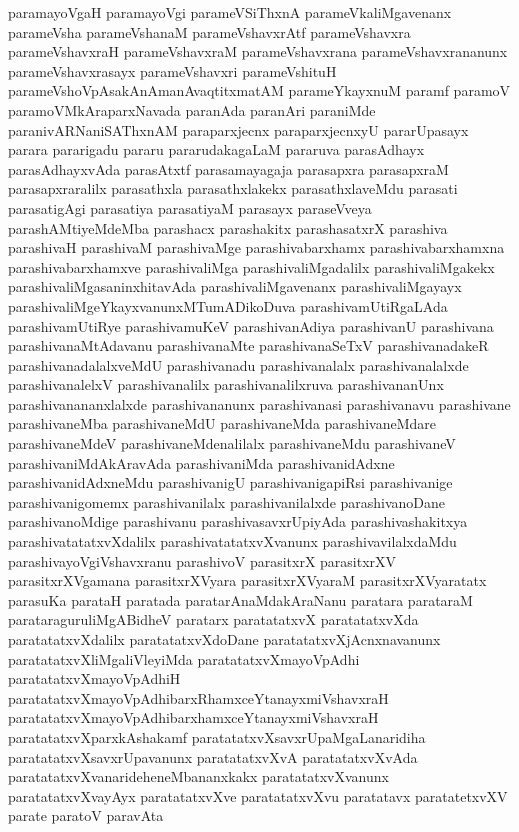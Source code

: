 {paramayoVgaH
paramayoVgi
parameVSiThxnA
parameVkaliMgavenanx
parameVsha
parameVshanaM
parameVshavxrAtf
parameVshavxra
parameVshavxraH
parameVshavxraM
parameVshavxrana
parameVshavxrananunx
parameVshavxrasayx
parameVshavxri
parameVshituH
parameVshoVpAsakAnAmanAvaqtitxmatAM
parameYkayxnuM
paramf
paramoV
paramoVMkAraparxNavada
paranAda
paranAri
paraniMde
paranivARNaniSAThxnAM
paraparxjecnx
paraparxjecnxyU
pararUpasayx
parara
pararigadu
pararu
pararudakagaLaM
pararuva
parasAdhayx
parasAdhayxvAda
parasAtxtf
parasamayagaja
parasapxra
parasapxraM
parasapxraralilx
parasathxla
parasathxlakekx
parasathxlaveMdu
parasati
parasatigAgi
parasatiya
parasatiyaM
parasayx
paraseVveya
parashAMtiyeMdeMba
parashacx
parashakitx
parashasatxrX
parashiva
parashivaH
parashivaM
parashivaMge
parashivabarxhamx
parashivabarxhamxna
parashivabarxhamxve
parashivaliMga
parashivaliMgadalilx
parashivaliMgakekx
parashivaliMgasaninxhitavAda
parashivaliMgavenanx
parashivaliMgayayx
parashivaliMgeYkayxvanunxMTumADikoDuva
parashivamUtiRgaLAda
parashivamUtiRye
parashivamuKeV
parashivanAdiya
parashivanU
parashivana
parashivanaMtAdavanu
parashivanaMte
parashivanaSeTxV
parashivanadakeR
parashivanadalalxveMdU
parashivanadu
parashivanalalx
parashivanalalxde
parashivanalelxV
parashivanalilx
parashivanalilxruva
parashivananUnx
parashivanananxlalxde
parashivananunx
parashivanasi
parashivanavu
parashivane
parashivaneMba
parashivaneMdU
parashivaneMda
parashivaneMdare
parashivaneMdeV
parashivaneMdenalilalx
parashivaneMdu
parashivaneV
parashivaniMdAkAravAda
parashivaniMda
parashivanidAdxne
parashivanidAdxneMdu
parashivanigU
parashivanigapiRsi
parashivanige
parashivanigomemx
parashivanilalx
parashivanilalxde
parashivanoDane
parashivanoMdige
parashivanu
parashivasavxrUpiyAda
parashivashakitxya
parashivatatatxvXdalilx
parashivatatatxvXvanunx
parashivavilalxdaMdu
parashivayoVgiVshavxranu
parashivoV
parasitxrX
parasitxrXV
parasitxrXVgamana
parasitxrXVyara
parasitxrXVyaraM
parasitxrXVyaratatx
parasuKa
parataH
paratada
paratarAnaMdakAraNanu
paratara
parataraM
parataraguruliMgABidheV
paratarx
paratatatxvX
paratatatxvXda
paratatatxvXdalilx
paratatatxvXdoDane
paratatatxvXjAcnxnavanunx
paratatatxvXliMgaliVleyiMda
paratatatxvXmayoVpAdhi
paratatatxvXmayoVpAdhiH
paratatatxvXmayoVpAdhibarxRhamxceYtanayxmiVshavxraH
paratatatxvXmayoVpAdhibarxhamxceYtanayxmiVshavxraH
paratatatxvXparxkAshakamf
paratatatxvXsavxrUpaMgaLanaridiha
paratatatxvXsavxrUpavanunx
paratatatxvXvA
paratatatxvXvAda
paratatatxvXvanarideheneMbananxkakx
paratatatxvXvanunx
paratatatxvXvayAyx
paratatatxvXve
paratatatxvXvu
paratatavx
paratatetxvXV
parate
paratoV
paravAta
}
